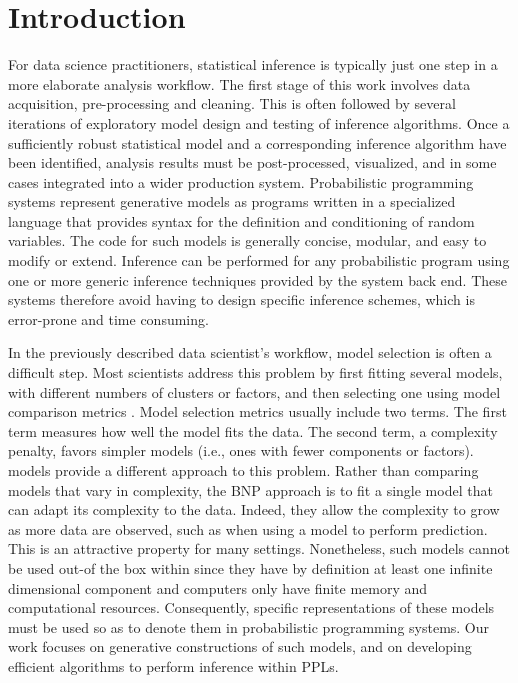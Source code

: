 \documentclass[twoside,10pt,openany,a4paper]{rapport}
\begin{document}

\mainmatter


\chapter{Introduction}

For data science practitioners, statistical inference is typically just one step in a more elaborate analysis workflow. The first stage of this work involves data acquisition, pre-processing and cleaning. This is often followed by several iterations of exploratory model design and testing of inference algorithms. Once a sufficiently robust statistical model and a corresponding inference algorithm have been identified, analysis results must be post-processed, visualized, and in some cases integrated into a wider production system.
Probabilistic programming systems \cite{Gordon:2014:PP:2593882.2593900,Goodman:2012uq,Mansinghka:2014ty,wood-aistats-2014,Turing} represent generative models as programs written in a specialized language that provides syntax for the definition and conditioning of random variables. The code for such models is generally concise, modular, and easy to modify or extend. Inference can be performed for any probabilistic program using one or more generic inference techniques provided by the system back end. These systems therefore avoid having to design specific inference schemes, which is error-prone and time consuming.

In the previously described data scientist's workflow, model selection is often a difficult step.
Most scientists address this problem by first fitting several models, with different numbers of clusters or factors, and then selecting one using model comparison metrics \cite{Claeskens:1251912}. Model selection metrics usually include two terms. The first term measures how well the model fits the data. The second term, a complexity penalty, favors simpler models (i.e., ones with fewer components or factors).
 models provide a different approach to this problem. Rather than comparing models that vary in complexity, the \gls{BNP} approach is to fit a single model that can adapt its complexity to the data. Indeed, they allow the complexity to grow as more data are observed, such as when using a model to perform prediction. This is an attractive property for many settings.
Nonetheless, such models cannot be used out-of the box within  since they have by definition at least one infinite dimensional component and computers only have finite memory and computational resources. Consequently, specific representations of these models must be used so as to denote them in probabilistic programming systems. Our work focuses on generative constructions of such models, and on developing efficient algorithms to perform inference within \glspl{PPL}.
\end{document}
